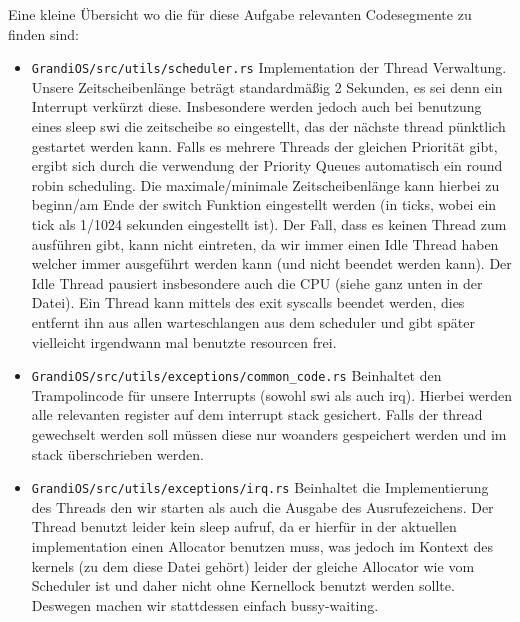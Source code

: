 \begin{description}
Eine kleine Übersicht wo die für diese Aufgabe relevanten Codesegmente zu finden sind:
\begin{itemize}
	\item \texttt{GrandiOS/src/utils/scheduler.rs} Implementation der Thread Verwaltung. Unsere Zeitscheibenlänge beträgt standardmäßig 2 Sekunden, es sei denn ein Interrupt verkürzt diese. Insbesondere werden jedoch auch bei benutzung eines sleep swi die zeitscheibe so eingestellt, das der nächste thread pünktlich gestartet werden kann. Falls es mehrere Threads der gleichen Priorität gibt, ergibt sich durch die verwendung der Priority Queues automatisch ein round robin scheduling. Die maximale/minimale Zeitscheibenlänge kann hierbei zu beginn/am Ende der switch Funktion eingestellt werden (in ticks, wobei ein tick als 1/1024 sekunden eingestellt ist). Der Fall, dass es keinen Thread zum ausführen gibt, kann nicht eintreten, da wir immer einen Idle Thread haben welcher immer ausgeführt werden kann (und nicht beendet werden kann). Der Idle Thread pausiert insbesondere auch die CPU (siehe ganz unten in der Datei). Ein Thread kann mittels des exit syscalls beendet werden, dies entfernt ihn aus allen warteschlangen aus dem scheduler und gibt später vielleicht irgendwann mal benutzte resourcen frei.
	\item \texttt{GrandiOS/src/utils/exceptions/common\_code.rs} Beinhaltet den Trampolincode für unsere Interrupts (sowohl swi als auch irq). Hierbei werden alle relevanten register auf dem interrupt stack gesichert. Falls der thread gewechselt werden soll müssen diese nur woanders gespeichert werden und im stack überschrieben werden.
	\item \texttt{GrandiOS/src/utils/exceptions/irq.rs} Beinhaltet die Implementierung des Threads den wir starten als auch die Ausgabe des Ausrufezeichens. Der Thread benutzt leider kein sleep aufruf, da er hierfür in der aktuellen implementation einen Allocator benutzen muss, was jedoch im Kontext des kernels (zu dem diese Datei gehört) leider der gleiche Allocator wie vom Scheduler ist und daher nicht ohne Kernellock benutzt werden sollte. Deswegen machen wir stattdessen einfach bussy-waiting.
\end{itemize}

\end{description}

